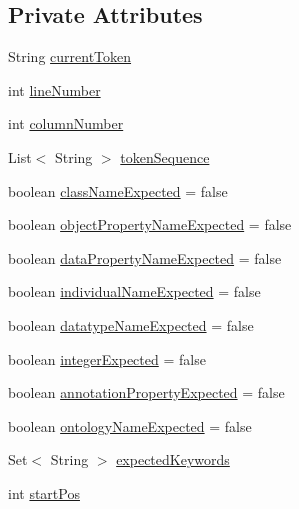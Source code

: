 \subsection*{Private Attributes}
\begin{DoxyCompactItemize}
\item 
String \hyperlink{classorg_1_1semanticweb_1_1owlapi_1_1expression_1_1_parser_exception_a7db7e0dca06ad9d030650ae9a192bff4}{current\-Token}
\item 
int \hyperlink{classorg_1_1semanticweb_1_1owlapi_1_1expression_1_1_parser_exception_ae9a71f2ab800c49add16d757138ee8e6}{line\-Number}
\item 
int \hyperlink{classorg_1_1semanticweb_1_1owlapi_1_1expression_1_1_parser_exception_a91ea5b674305b80834b89b4b3738c40b}{column\-Number}
\item 
List$<$ String $>$ \hyperlink{classorg_1_1semanticweb_1_1owlapi_1_1expression_1_1_parser_exception_a5d4c1095ba777f96929f108426a0f9be}{token\-Sequence}
\item 
boolean \hyperlink{classorg_1_1semanticweb_1_1owlapi_1_1expression_1_1_parser_exception_a1ca9276cc35a93f5ba65b70c0c20f390}{class\-Name\-Expected} = false
\item 
boolean \hyperlink{classorg_1_1semanticweb_1_1owlapi_1_1expression_1_1_parser_exception_ad69d3086accb03725f4403efc0f11d65}{object\-Property\-Name\-Expected} = false
\item 
boolean \hyperlink{classorg_1_1semanticweb_1_1owlapi_1_1expression_1_1_parser_exception_a8da7aea5d88cf0b9463bb37e7b87f57e}{data\-Property\-Name\-Expected} = false
\item 
boolean \hyperlink{classorg_1_1semanticweb_1_1owlapi_1_1expression_1_1_parser_exception_acf605262ffa88790e7f3a72d9278fe4b}{individual\-Name\-Expected} = false
\item 
boolean \hyperlink{classorg_1_1semanticweb_1_1owlapi_1_1expression_1_1_parser_exception_a416ad0846a76f735383c9c83d7085d46}{datatype\-Name\-Expected} = false
\item 
boolean \hyperlink{classorg_1_1semanticweb_1_1owlapi_1_1expression_1_1_parser_exception_a737bbd25d3401df3c07bc032ccdd2f27}{integer\-Expected} = false
\item 
boolean \hyperlink{classorg_1_1semanticweb_1_1owlapi_1_1expression_1_1_parser_exception_afaa940a4133e906a79b7752112422de8}{annotation\-Property\-Expected} = false
\item 
boolean \hyperlink{classorg_1_1semanticweb_1_1owlapi_1_1expression_1_1_parser_exception_a3f24b21677ee4ce0eaa598adc9578f16}{ontology\-Name\-Expected} = false
\item 
Set$<$ String $>$ \hyperlink{classorg_1_1semanticweb_1_1owlapi_1_1expression_1_1_parser_exception_a975fa3df39cae70a3df92caca7308bdf}{expected\-Keywords}
\item 
int \hyperlink{classorg_1_1semanticweb_1_1owlapi_1_1expression_1_1_parser_exception_abf9915df70aa9c722516081d133ddec0}{start\-Pos}
\end{DoxyCompactItemize}
